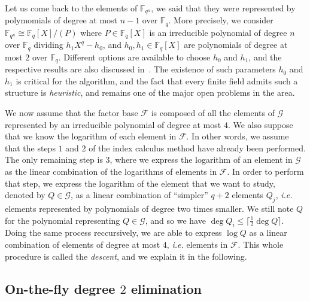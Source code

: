 \documentclass[a4paper,11pt]{article}
\theoremstyle{break}
\theoremstyle{sc}
\theoremstyle{definition}
\theoremstyle{remark}
\newcommand{\ie}{\emph{i.e. }}
\begin{document}
Let us come back to the elements of $\mathbb{F}_{q^n}$, we said that they were
represented by polymomials of degree at most $n-1$ over $\mathbb{F}_q$. More
precisely, we consider $\mathbb{F}_{q^n}\cong \mathbb{F}_{q}[X]/(P)$ where $P\in
\mathbb{F}_{q}[X]$ is an irreducible polynomial of degree $n$ over
$\mathbb{F}_{q}$ dividing $h_1X^q-h_0$, and $h_0, h_1\in \mathbb{F}_q[X]$ are
polynomials of degree at most $2$ over $\mathbb{F}_q$. Different options are
available to choose $h_0$ and $h_1$, and the respective results are also
discussed in~\cite{JP14}. The existence of such parameters $h_0$ and $h_1$ is
critical for the algorithm, and the fact that every finite field admits such a
structure is \emph{heuristic}, and remains one of the major open problems in the
area.

We now assume that the factor base $\mathcal F$ is composed of all the
elements of $\mathcal G$ represented by an irreducible polynomial of degree at
most $4$. We also suppose that we know the logarithm of each element in
$\mathcal F$. In other words, we assume that the steps $1$ and $2$ of the index
calculus method have already been performed. The only remaining step is $3$,
where we express the logarithm of an element in $\mathcal G$ as the linear
combination of the logarithms of elements in $\mathcal F$. In order to perform
that step, we express the logarithm of the element that we want to study, denoted by
$Q\in\mathcal G$, as a linear combination of ``simpler'' $q+2$ elements $Q_j$,
\ie elements represented by polynomials of degree two times smaller. We
still note $Q$ for the polynomial representing $Q\in
\mathcal G$, and so we have $\deg Q_i\leq \lceil \frac{1}{2}\deg Q\rceil$. Doing
the same process reccursively, we are able to express $\log Q$ as a linear
combination of elements of degree at most $4$, \ie elements in $\mathcal F$.
This whole procedure is called the \emph{descent}, and we explain it in the
following. 

\subsection{On-the-fly degree $2$ elimination}
\end{document}
